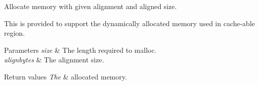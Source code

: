 Allocate memory with given alignment and aligned size. 

This is provided to support the dynamically allocated memory used in cache-\/able region. 
\begin{DoxyParams}{Parameters}
{\em size} & The length required to malloc. \\
\hline
{\em alignbytes} & The alignment size. \\
\hline
\end{DoxyParams}

\begin{DoxyRetVals}{Return values}
{\em The} & allocated memory. \\
\hline
\end{DoxyRetVals}
